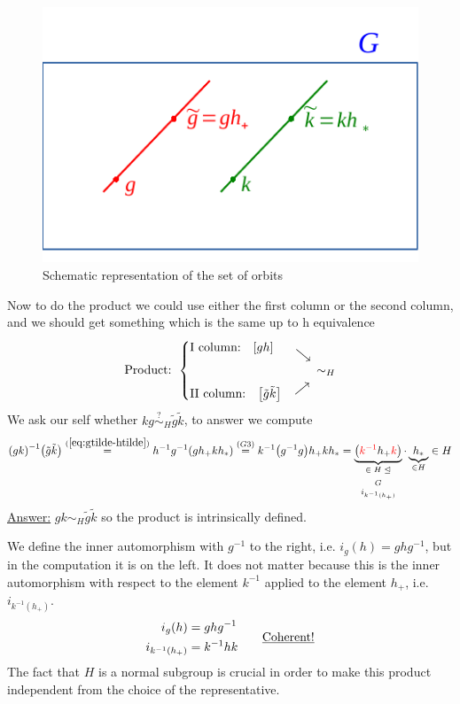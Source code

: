 \documentclass[../main.tex]{subfiles}
\begin{document}
\begin{figure}[h!]
	\includegraphics{images/orbits2.pdf}
	\caption{Schematic representation of the set of orbits}
\end{figure}
Now to do the product we could use either the first column or the second column, and we should get something which is the same up to h equivalence
\[
\textrm{Product: } 
\begin{cases}
\textrm{I column:} \quad \bqty{gh} &\rotatebox{-40}{$\longrightarrow$}\\
\\
\textrm{II column:} \quad \bqty{\tilde{g}\tilde{k}} &\rotatebox{40}{$\longrightarrow$}
\end{cases}
\sim_H
\]
We ask our self whether $kg\overset{?}{\sim}_H\tilde{g}\tilde{k}$, to answer we compute 
\[
\pqty{gk}^{-1}\pqty{\tilde{g}\tilde{k}}\overset{(\ref{eq:gtilde-htilde})}{=}h^{-1}g^{-1}\pqty{gh_+kh_\ast}\overset{(G3)}{=}k^{-1}\pqty{g^{-1}g}h_+kh_\ast=\underbrace{\left({\color{red}k^{-1}}h_+ {\color{red}k}\right)}_{\text{\parbox{1.1 cm}{\centering $\in H\trianglelefteq G$ \\[-4pt]$i_{k^{-1}(h_+)}$}}}\cdot \underbrace{h_\ast}_{\in H}\in H
\]
\underline{Answer:} $gk \sim_H \tilde{g}\tilde{k}$ so the product is intrinsically defined.
\begin{kaobox}[frametitle=Remark]
We define the inner automorphism with $g^{-1}$ to the right, i.e. $i_g(h)=ghg^{-1}$, but in the computation it is on the left. It does not matter because this is the inner automorphism with respect to the element $k^{-1}$ applied to the element $h_+$, i.e. $i_{k^{-1}(h_+)}$. 
\[
\begin{split}
  i_g(h)&=ghg^{-1}\\
  i_{k^{-1}(h_+)}&=k^{-1}hk
\end{split}
\qquad \textrm{\underline{Coherent!}}
\]
The fact that $H$ is a normal subgroup is crucial in order to make this product independent from the choice of the representative.
\end{kaobox}
\end{document}
